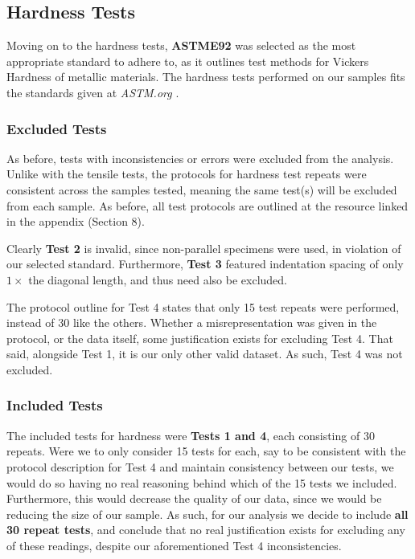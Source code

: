 \documentclass{article}
\begin{document}
\subsection{Hardness Tests}
Moving on to the hardness tests, \textbf{ASTME92} was selected as the most appropriate standard to adhere to, as it outlines test methods for Vickers Hardness of metallic materials. The hardness tests performed on our samples fits the standards given at \textit{ASTM.org} \cite{ASTME92}.

\subsubsection{Excluded Tests}
As before, tests with inconsistencies or errors were excluded from the analysis. Unlike with the tensile tests, the protocols for hardness test repeats were consistent across the samples tested, meaning the same test(s) will be excluded from each sample. As before, all test protocols are outlined at the resource linked in the appendix (Section 8).

Clearly \textbf{Test 2} is invalid, since non-parallel specimens were used, in violation of our selected standard. Furthermore, \textbf{Test 3} featured indentation spacing of only $1 \times$ the diagonal length, and thus need also be excluded.

The protocol outline for Test 4 states that only 15 test repeats were performed, instead of 30 like the others. Whether a misrepresentation was given in the protocol, or the data itself, some justification exists for excluding Test 4. That said, alongside Test 1, it is our only other valid dataset. As such, Test 4 was not excluded.

\subsubsection{Included Tests}
The included tests for hardness were \textbf{Tests 1 and 4}, each consisting of 30 repeats. Were we to only consider 15 tests for each, say to be consistent with the protocol description for Test 4 and maintain consistency between our tests, we would do so having no real reasoning behind which of the 15 tests we included. Furthermore, this would decrease the quality of our data, since we would be reducing the size of our sample. As such, for our analysis we decide to include \textbf{all 30 repeat tests}, and conclude that no real justification exists for excluding any of these readings, despite our aforementioned Test 4 inconsistencies. 
\end{document}
